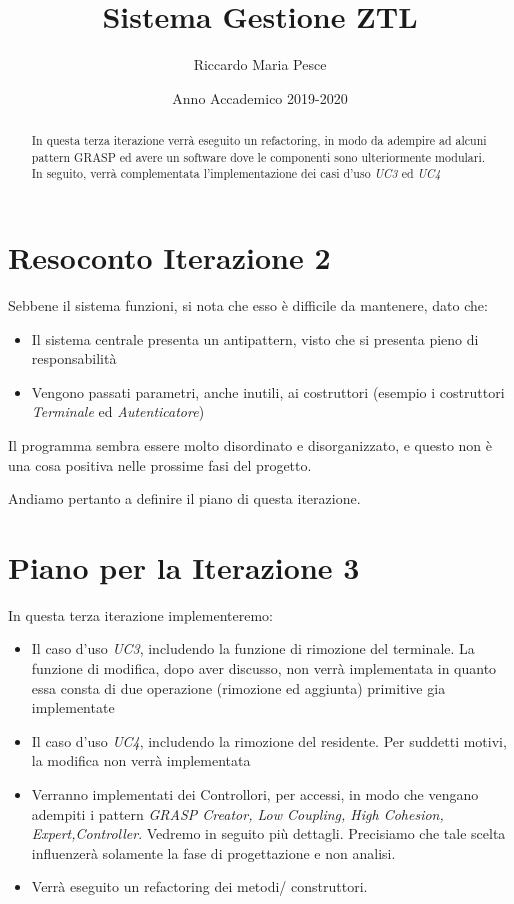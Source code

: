 \documentclass[12pt, letterpaper]{article}
\title{Sistema Gestione ZTL}
\author{Riccardo Maria Pesce}
\date{Anno Accademico 2019-2020}
\begin{document}
\begin{titlepage}

\maketitle

\begin{abstract}

\noindent
In questa terza iterazione verrà eseguito un refactoring,
in modo da adempire ad alcuni pattern GRASP ed avere un 
software dove le componenti sono ulteriormente modulari.
In seguito, verrà complementata l'implementazione dei casi
d'uso \emph{UC3} ed \emph{UC4}

\end{abstract}
\end{titlepage}

\tableofcontents{}

\pagebreak

\section{Resoconto Iterazione 2}
Sebbene il sistema funzioni, si nota che esso 
è difficile da mantenere, dato che:
\begin{itemize}
    \item Il sistema centrale presenta un 
    antipattern, visto che si presenta 
    pieno di responsabilità
    \item Vengono passati parametri, anche 
    inutili, ai costruttori (esempio i costruttori
    \emph{Terminale} ed \emph{Autenticatore})
\end{itemize}

\noindent
Il programma sembra essere molto disordinato e 
disorganizzato, e questo non è una cosa positiva
nelle prossime fasi del progetto.

\noindent
Andiamo pertanto a definire il piano di questa 
iterazione.

\section{Piano per la Iterazione 3}
In questa terza iterazione implementeremo:
\begin{itemize}
    \item Il caso d'uso \emph{UC3}, includendo
    la funzione di rimozione del terminale.
    La funzione di modifica, dopo aver discusso,
    non verrà implementata in quanto essa consta 
    di due operazione (rimozione ed aggiunta) primitive
    gia implementate
    \item Il caso d'uso \emph{UC4}, includendo la 
    rimozione del residente. Per suddetti motivi,
    la modifica non verrà implementata
    \item Verranno implementati dei Controllori, per 
    accessi, in modo che vengano adempiti i pattern 
    \emph{GRASP Creator, Low Coupling, High Cohesion, 
    Expert,Controller}. Vedremo in seguito più 
    dettagli. Precisiamo che tale scelta influenzerà
    solamente la fase di progettazione e non analisi.
    \item Verrà eseguito un refactoring dei metodi/
    construttori.
\end{itemize}
\end{document}
